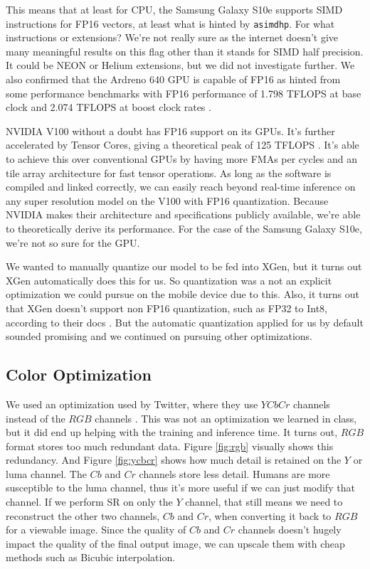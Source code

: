 \documentclass{article}
\begin{document}
This means that at least for CPU, the Samsung Galaxy S10e supports SIMD instructions for FP16 vectors, at least what is hinted by \verb|asimdhp|. For what instructions or extensions? We're not really sure as the internet doesn't give many meaningful results on this flag other than it stands for SIMD half precision. It could be NEON or Helium extensions, but we did not investigate further. We also confirmed that the Ardreno 640 GPU is capable of FP16 as hinted from some performance benchmarks with FP16 performance of 1.798 TFLOPS at base clock and 2.074 TFLOPS at boost clock rates \cite{ardreno640}.

NVIDIA V100 without a doubt has FP16 support on its GPUs. It's further accelerated by Tensor Cores, giving a theoretical peak of 125 TFLOPS \cite{v100}. It's able to achieve this over conventional GPUs by having more FMAs per cycles and an tile array architecture for fast tensor operations. As long as the software is compiled and linked correctly, we can easily reach beyond real-time inference on any super resolution model on the V100 with FP16 quantization. Because NVIDIA makes their architecture and specifications publicly available, we're able to theoretically derive its performance. For the case of the Samsung Galaxy S10e, we're not so sure for the GPU.

We wanted to manually quantize our model to be fed into XGen, but it turns out XGen automatically does this for us. So quantization was a not an explicit optimization we could pursue on the mobile device due to this. Also, it turns out that XGen doesn't support non FP16 quantization, such as FP32 to Int8, according to their docs \cite{xgen-docs, issue26}. But the automatic quantization applied for us by default sounded promising and we continued on pursuing other optimizations.

\subsection{Color Optimization}
We used an optimization used by Twitter, where they use $YCbCr$ channels instead of the $RGB$ channels \cite{twitter-superresolution}. This was not an optimization we learned in class, but it did end up helping with the training and inference time. It turns out, $RGB$ format stores too much redundant data. Figure \ref{fig:rgb} visually shows this redundancy. And Figure \ref{fig:ycbcr} shows how much detail is retained on the $Y$ or luma channel. The $Cb$ and $Cr$ channels store less detail. Humans are more susceptible to the luma channel, thus it's more useful if we can just modify that channel. If we perform SR on only the $Y$ channel, that still means we need to reconstruct the other two channels, $Cb$ and $Cr$, when converting it back to $RGB$ for a viewable image. Since the quality of $Cb$ and $Cr$ channels doesn't hugely impact the quality of the final output image, we can upscale them with cheap methods such as Bicubic interpolation.
\end{document}
